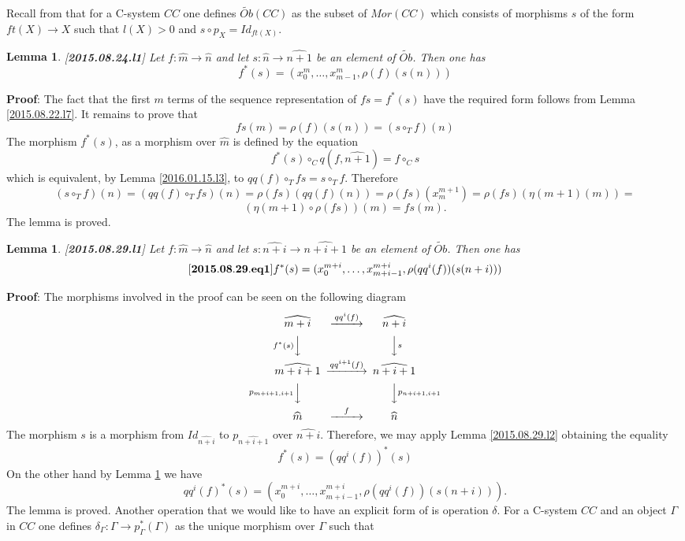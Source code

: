 \documentclass[11pt]{article}
\newenvironment{eq}{\begin{equation}}{\end{equation}}
\newenvironment{proof}{{\bf Proof}:}{\vskip 5mm }
\newtheorem{lemma}[proposition]{Lemma}
\newcommand{\llabel}[1]{\label{#1}[{\bf #1}]}
\newcommand{\sr}{\rightarrow}
\newcommand{\wt}{\widetilde}
\newcommand{\wh}{\widehat}
\newcommand{\mbind}{\rho}
\newcommand{\hc}{\circ_{T}}
\begin{document}
Recall from \cite{Csubsystems} that for a C-system $CC$ one defines $\wt{Ob}(CC)$ as the subset of $Mor(CC)$ which consists of morphisms $s$ of the form $ft(X)\sr X$ such that $l(X)>0$ and $s\circ p_X=Id_{ft(X)}$. 
%
\begin{lemma}
\llabel{2015.08.24.l1}
Let $f:\wh{m}\sr\wh{n}$ and let $s:\wh{n}\sr\wh{n+1}$ be an element of $\wt{Ob}$. Then one has
%
$$f^*(s)=(x_0^m,\dots,x_{m-1}^m,\mbind(f)(s(n)))$$
%
\end{lemma}
%
\begin{proof}
The fact that the first $m$ terms of the sequence representation of $fs=f^*(s)$ have the required form follows from Lemma \ref{2015.08.22.l7}. It remains to prove that
%
$$fs(m)=\mbind(f)(s(n))=(s\hc f)(n)$$
%
The morphism $f^*(s)$, as a morphism over $\wh{m}$ is defined by the equation
%
$$f^*(s)\circ_C q(f,\wh{n+1})=f\circ_C s$$
%
which is equivalent, by Lemma \ref{2016.01.15.l3},  to $qq(f)\hc fs=s\hc f$. Therefore 
%
$$(s\hc f)(n)=(qq(f)\hc fs)(n)=\mbind(fs)(qq(f)(n))=\mbind(fs)(x_m^{m+1})=\mbind(fs)(\eta(m+1)(m))=$$$$(\eta(m+1)\circ\mbind(fs))(m)=fs(m).$$ 
%
The lemma is proved.
\end{proof}
%
\begin{lemma}
\llabel{2015.08.29.l1}
Let $f:\wh{m}\sr\wh{n}$ and let $s:\wh{n+i}\sr\wh{n+i+1}$ be an element of $\wt{Ob}$. Then one has
%
\begin{eq}\llabel{2015.08.29.eq1}
f^*(s)=(x_0^{m+i},\dots,x_{m+i-1}^{m+i},\mbind(qq^i(f))(s(n+i)))
\end{eq}
%
\end{lemma}
%
\begin{proof}
The morphisms involved in the proof can be seen on the following diagram
%
$$
\begin{CD}
\wh{m+i} @>qq^i(f)>> \wh{n+i}\\
@Vf^*(s)VV @VVsV\\
\wh{m+i+1} @>qq^{i+1}(f)>> \wh{n+i+1}\\
@Vp_{m+i+1,i+1}VV @VVp_{n+i+1,i+1}V\\
\wh{m} @>f>> \wh{n}
\end{CD}
$$
%
The morphism $s$ is a morphism from $Id_{\wh{n+i}}$ to $p_{\wh{n+i+1}}$ over $\wh{n+i}$. Therefore, we may apply Lemma \ref{2015.08.29.l2} obtaining the equality
%
$$f^*(s)=(qq^i(f))^*(s)$$
%
On the other hand by Lemma \ref{2015.08.24.l1} we have
%
$$qq^i(f)^*(s)=(x_0^{m+i},\dots,x_{m+i-1}^{m+i},\mbind(qq^i(f))(s(n+i))).$$
%
The lemma is proved. 
\end{proof}
%
Another operation that we would like to have an explicit form of is operation $\delta$. For a C-system $CC$ and an object $\Gamma$ in $CC$ one defines $\delta_{\Gamma}:\Gamma\sr p_{\Gamma}^*(\Gamma)$ as the unique morphism over $\Gamma$ such that 
\end{document}
